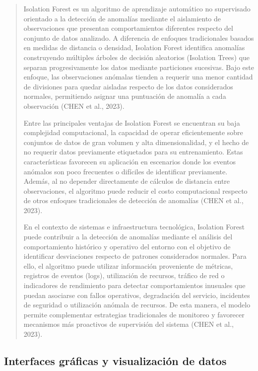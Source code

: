 \documentclass[
]{article}
\begin{document}
\begin{quote}
Isolation Forest es un algoritmo de aprendizaje automático no
supervisado orientado a la detección de anomalías mediante el
aislamiento de observaciones que presentan comportamientos diferentes
respecto del conjunto de datos analizado. A diferencia de enfoques
tradicionales basados en medidas de distancia o densidad, Isolation
Forest identifica anomalías construyendo múltiples árboles de decisión
aleatorios (Isolation Trees) que separan progresivamente los datos
mediante particiones sucesivas. Bajo este enfoque, las observaciones
anómalas tienden a requerir una menor cantidad de divisiones para quedar
aisladas respecto de los datos considerados normales, permitiendo
asignar una puntuación de anomalía a cada observación (CHEN et al.,
2023).

Entre las principales ventajas de Isolation Forest se encuentran su baja
complejidad computacional, la capacidad de operar eficientemente sobre
conjuntos de datos de gran volumen y alta dimensionalidad, y el hecho de
no requerir datos previamente etiquetados para su entrenamiento. Estas
características favorecen su aplicación en escenarios donde los eventos
anómalos son poco frecuentes o difíciles de identificar previamente.
Además, al no depender directamente de cálculos de distancia entre
observaciones, el algoritmo puede reducir el costo computacional
respecto de otros enfoques tradicionales de detección de anomalías (CHEN
et al., 2023).

En el contexto de sistemas e infraestructura tecnológica, Isolation
Forest puede contribuir a la detección de anomalías mediante el análisis
del comportamiento histórico y operativo del entorno con el objetivo de
identificar desviaciones respecto de patrones considerados normales.
Para ello, el algoritmo puede utilizar información proveniente de
métricas, registros de eventos (logs), utilización de recursos, tráfico
de red o indicadores de rendimiento para detectar comportamientos
inusuales que puedan asociarse con fallos operativos, degradación del
servicio, incidentes de seguridad o utilización anómala de recursos. De
esta manera, el modelo permite complementar estrategias tradicionales de
monitoreo y favorecer mecanismos más proactivos de supervisión del
sistema (CHEN et al., 2023).
\end{quote}

\subsection{Interfaces gráficas y visualización de
datos}\label{interfaces-gruxe1ficas-y-visualizaciuxf3n-de-datos}
\end{document}
